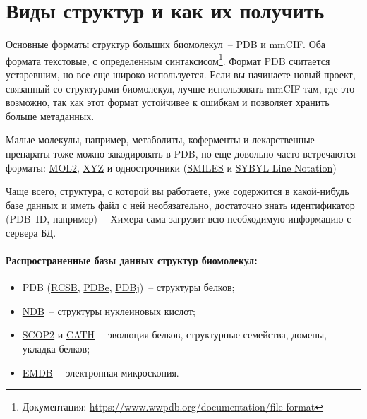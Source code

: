 \section{Виды структур и как их получить}
Основные форматы структур больших биомолекул~-- PDB и mmCIF. Оба формата текстовые, с определенным 
синтаксисом\footnote{Документация: \url{https://www.wwpdb.org/documentation/file-format}}. 
Формат PDB считается устаревшим, но все еще широко используется. Если вы начинаете новый проект, 
связанный со структурами биомолекул, лучше использовать mmCIF там, где это возможно, так как этот
формат устойчивее к ошибкам и позволяет хранить больше метаданных.

Малые молекулы, например, метаболиты, коферменты и лекарственные препараты тоже можно закодировать в PDB, но еще довольно часто встречаются форматы: \href{https://reference.wolfram.com/language/ref/format/MOL2.html}{MOL2}, \href{http://libatoms.github.io/QUIP/io.html#extendedxyz}{XYZ} и однострочники (\href{http://opensmiles.org/opensmiles.html}{SMILES} и \href{https://pubs.acs.org/doi/pdfplus/10.1021/ci960109j}{SYBYL Line Notation})

Чаще всего, структура, с которой вы работаете, уже содержится в какой-нибудь базе данных и иметь файл с ней необязательно, достаточно знать идентификатор (PDB~ID, например)~-- Химера сама загрузит всю необходимую информацию с сервера БД.

\paragraph{Распространенные базы данных структур биомолекул:}
\begin{itemize}
    \item PDB (\href{https://rcsb.org/pdb}{RCSB}, \href{https://www.ebi.ac.uk/pdbe}{PDBe}, \href{https://pdbj.org}{PDBj})~-- структуры белков;
    \item \href{http://ndbserver.rutgers.edu}{NDB}~-- структуры нуклеиновых кислот;
    \item \href{http://scop2.mrc-lmb.cam.ac.uk}{SCOP2} и \href{http://www.cathdb.info}{CATH}~-- эволюция белков, структурные семейства, домены, ук\-лад\-ка белков;
    \item \href{https://www.ebi.ac.uk/pdbe/emdb/}{EMDB}~-- электронная микроскопия.
\end{itemize}

